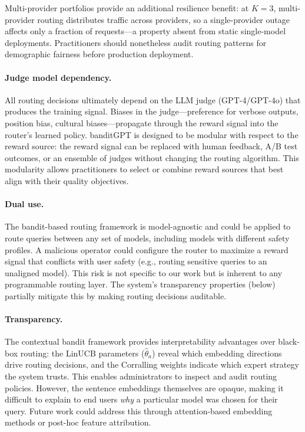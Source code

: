 Multi-provider portfolios provide an additional resilience benefit: at
$K{=}3$, multi-provider routing distributes traffic across providers, so a single-provider
outage affects only a fraction of requests---a property absent from static
single-model deployments.
Practitioners should nonetheless audit routing patterns for demographic
fairness before production deployment.

\paragraph{Judge model dependency.}
All routing decisions ultimately depend on the LLM judge (GPT-4/GPT-4o) that
produces the training signal.  Biases in the judge---preference for verbose
outputs, position bias, cultural biases---propagate through the reward signal
into the router's learned policy.  banditGPT is designed to be modular with
respect to the reward source: the reward signal can be replaced with human
feedback, A/B test outcomes, or an ensemble of judges without changing the
routing algorithm.  This modularity allows practitioners to select or combine
reward sources that best align with their quality objectives.

\paragraph{Dual use.}
The bandit-based routing framework is model-agnostic and could be applied to
route queries between any set of models, including models with different
safety profiles.  A malicious operator could configure the router to maximize
a reward signal that conflicts with user safety (e.g., routing sensitive
queries to an unaligned model).  This risk is not specific to our work but is
inherent to any programmable routing layer.  The system's transparency
properties (below) partially mitigate this by making routing decisions
auditable.

\paragraph{Transparency.}
The contextual bandit framework provides interpretability advantages over
black-box routing: the LinUCB parameters ($\hat{\theta}_a$) reveal which
embedding directions drive routing decisions, and the Corralling weights
indicate which expert strategy the system trusts.  This enables
administrators to inspect and audit routing policies.  However, the
sentence embeddings themselves are opaque, making it difficult to explain
to end users \emph{why} a particular model was chosen for their query.
Future work could address this through attention-based embedding methods
or post-hoc feature attribution.
